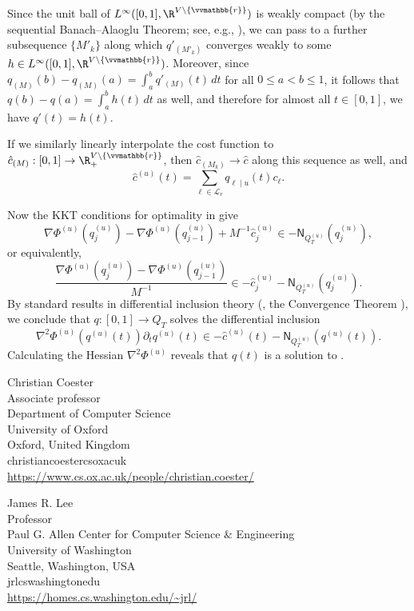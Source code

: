 \documentclass{toc}
\newcommand{\calL}{\mathcal L}
\newcommand{\vvr}{\vvmathbb{r}}
\newcommand{\sfN}{\mathsf N}
\begin{document}
Since the unit ball of $L^{\infty}([0,1], \R^{V \setminus \{\vvr\}})$ is weakly compact (by
the sequential Banach--Alaoglu Theorem; see, e.g., \cite[Thm. 0.3.3]{AC84}), we can pass to a further subsequence $\{M'_{k}\}$ along which %
$q'_{(M'_k)}$ converges weakly to some $h \in L^{\infty}([0,1], \R^{V \setminus \{\vvr\}})$.
Moreover,
since $q_{(M)}(b)-q_{(M)}(a) = \int_a^b q'_{(M)}(t)\,dt$ for all $0 \leq a < b \leq 1$, it follows that
$q(b)-q(a) = \int_a^b h(t)\,dt$ as well, and therefore
for almost all $t \in [0,1]$, we have $q'(t) = h(t)$.

If we similarly linearly interpolate the cost function to $\hat{c}_{(M)} : [0,1] \to \R_+^{V \setminus \{\vvr\}}$,
then $\hat{c}_{(M_k)} \to \hat{c}$ along this sequence as well,
and
\[
\hat{c}^{(u)}(t) = \sum_{\ell \in \calL_v} q_{\ell \mid u}(t) c_{\ell}.
\]

Now the KKT conditions for optimality in  give
\[
\nabla \Phi^{(u)}\left(q_j^{(u)}\right) - \nabla \Phi^{(u)}\left(q_{j-1}^{(u)}\right) + M^{-1} \hat{c}^{(u)}_j \in - \sfN_{Q_T^{(u)}}\left(q_j^{(u)}\right),
\]
or equivalently,
\[
\frac{\nabla \Phi^{(u)}\left(q_j^{(u)}\right) - \nabla \Phi^{(u)}\left(q_{j-1}^{(u)}\right)}{M^{-1}} \in -\hat{c}^{(u)}_j - \sfN_{Q_T^{(u)}}\left(q_j^{(u)}\right).
\]
By standard results in differential inclusion theory (\eg, the Convergence Theorem \cite[Thm. 1.4.1]{AC84}),
we conclude that $q : [0,1] \to Q_T$ solves the differential inclusion
\[
\nabla^2 \Phi^{(u)}\!\left(q^{(u)}(t)\right) \partial_t q^{(u)}(t) \in -\hat{c}^{(u)}(t) - \sfN_{Q_T^{(u)}}(q^{(u)}(t)).
\]
Calculating the Hessian $\nabla^2 \Phi^{(u)}$ reveals that $q(t)$ is a solution to .




%
%
%
%


%
%
%
%
%
\begin{tocauthors}
\begin{tocinfo}[coester]
 Christian Coester\\
 Associate professor\\%
 Department of Computer Science\\%
 University of Oxford\\%
 Oxford, United Kingdom\\%
 christian\tocdot{}coester\tocat{}cs\tocdot{}ox\tocdot{}ac\tocdot{}uk \\   %
 \url{https://www.cs.ox.ac.uk/people/christian.coester/}      %
\end{tocinfo}
\begin{tocinfo}[lee]
  James R. Lee\\
  Professor\\
  Paul G. Allen Center for Computer Science \& Engineering\\
  University of Washington\\
  Seattle, Washington, USA\\
  jrl\tocat{}cs\tocdot{}washington\tocdot{}edu \\
  \url{https://homes.cs.washington.edu/~jrl/}
\end{tocinfo}
\end{tocauthors}
\end{document}
